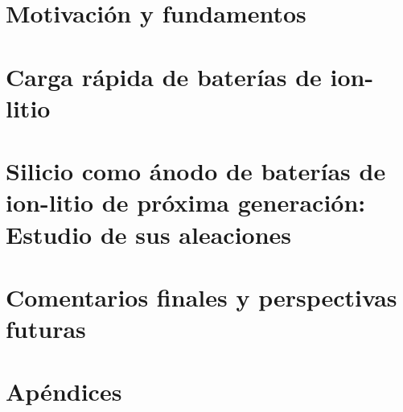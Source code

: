 \documentclass[12pt, spanish, a4paper, twoside]{book}
\newcommand\blankpage{%
    \null
    \thispagestyle{empty}%
    \addtocounter{page}{-1}%
    \newpage
}
\begin{document}
\frontmatter

\blankpage
\blankpage
\blankpage
\blankpage







\tableofcontents

\mainmatter


\part{Motivación y fundamentos}






\part{Carga rápida de baterías de ion-litio}\label{p:fast-charging}






\part{Silicio como ánodo de baterías de ion-litio de próxima generación: Estudio de sus aleaciones}\label{p:silicio}








\part{Comentarios finales y perspectivas futuras}




\part{Apéndices}

\appendix
\renewcommand\chaptername{Apéndice}






\blankpage
\blankpage
\blankpage
\blankpage
\end{document}
